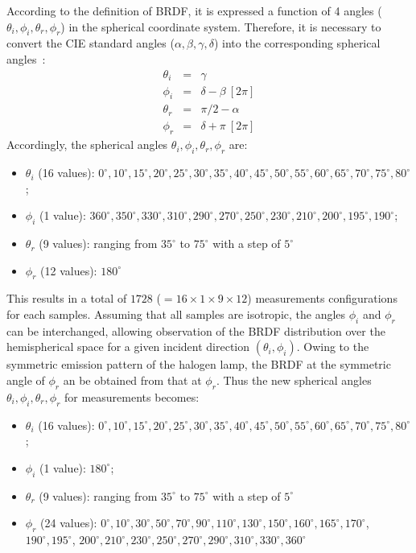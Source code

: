 According to the definition of BRDF, it is expressed a function of 4 angles ($\theta_i, \phi_i, \theta_r, \phi_r$) in the spherical coordinate system.
Therefore, it is necessary to convert the CIE standard angles ($\alpha,  \beta, \gamma, \delta$) into the corresponding spherical angles~\cite{2023_Boucher}:
\begin{equation}
    \label{eq:cie-to-sph}
    \begin{array}{lll}
        \theta_i & = & \gamma                  \\
        \phi_i   & = & \delta -\beta  \ [2\pi] \\
        \theta_r & = & \pi / 2 - \alpha        \\
        \phi_r   & = & \delta + \pi \ [2\pi]
    \end{array}
\end{equation}
Accordingly, the spherical angles $\theta_i, \phi_i, \theta_r, \phi_r$ are:
\begin{itemize}
    \item $\theta_i$ (16 values): $0^\circ, 10^\circ, 15^\circ, 20^\circ, 25^\circ, 30^\circ, 35^\circ, 40^\circ, 45^\circ, 50^\circ, 55^\circ, 60^\circ, 65^\circ, 70^\circ, 75^\circ, 80^\circ$;
    \item $\phi_i$ (1 value): $360^\circ, 350^\circ, 330^\circ, 310^\circ, 290^\circ, 270^\circ, 250^\circ, 230^\circ, 210^\circ, 200^\circ, 195^\circ, 190^\circ$;
    \item $\theta_r$ (9 values): ranging from $35^\circ$ to $75^\circ$ with a step of $5^\circ$
    \item $\phi_r$ (12 values): $180^\circ$
\end{itemize}
This results in a total of $1728$ ($= 16 \times 1 \times 9 \times 12$) measurements configurations for each samples.
Assuming that all samples are isotropic, the angles $\phi_i$ and $\phi_r$ can be interchanged, allowing observation of the BRDF distribution over the hemispherical space for a given incident direction $(\theta_i, \phi_i)$.
Owing to the symmetric emission pattern of the halogen lamp, the BRDF at the symmetric angle of $\phi_r$ an be obtained from that at $\phi_r$.
Thus the new spherical angles $\theta_i, \phi_i, \theta_r, \phi_r$ for measurements becomes:
\begin{itemize}
    \item $\theta_i$ (16 values): $0^\circ, 10^\circ, 15^\circ, 20^\circ, 25^\circ, 30^\circ, 35^\circ, 40^\circ, 45^\circ, 50^\circ, 55^\circ, 60^\circ, 65^\circ, 70^\circ, 75^\circ, 80^\circ$;
    \item $\phi_i$ (1 value): $180^\circ$;
    \item $\theta_r$ (9 values): ranging from $35^\circ$ to $75^\circ$ with a step of $5^\circ$
    \item $\phi_r$ (24 values): $0^\circ, 10^\circ, 30^\circ, 50^\circ, 70^\circ, 90^\circ, 110^\circ, 130^\circ, 150^\circ, 160^\circ, 165^\circ, 170^\circ$, $190^\circ, 195^\circ$, $200^\circ, 210^\circ, 230^\circ, 250^\circ, 270^\circ, 290^\circ, 310^\circ, 330^\circ, 360^\circ$
\end{itemize}
